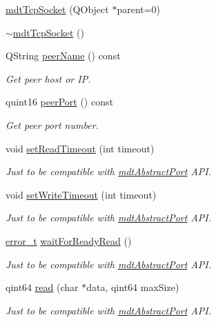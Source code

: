 \begin{DoxyCompactItemize}
\item 
\hyperlink{classmdt_tcp_socket_aeed1a50725a8e61f86de2bf67a92feb8}{mdt\-Tcp\-Socket} (Q\-Object $\ast$parent=0)
\item 
\hyperlink{classmdt_tcp_socket_ac1e7831d297471d6e5b920de5e9bb675}{$\sim$mdt\-Tcp\-Socket} ()
\item 
Q\-String \hyperlink{classmdt_tcp_socket_a1ce96231767c56f8108a8e977987e10f}{peer\-Name} () const 
\begin{DoxyCompactList}\small\item\em Get peer host or I\-P. \end{DoxyCompactList}\item 
quint16 \hyperlink{classmdt_tcp_socket_a2a6c3e034ca51a2f45ec136b864ba9a3}{peer\-Port} () const 
\begin{DoxyCompactList}\small\item\em Get peer port number. \end{DoxyCompactList}\item 
void \hyperlink{classmdt_tcp_socket_aae23057f2e0ee326d0fee78ffe3f00f9}{set\-Read\-Timeout} (int timeout)
\begin{DoxyCompactList}\small\item\em Just to be compatible with \hyperlink{classmdt_abstract_port}{mdt\-Abstract\-Port} A\-P\-I. \end{DoxyCompactList}\item 
void \hyperlink{classmdt_tcp_socket_ac59d2dfdf405b5382f0f20d5b9f75fd0}{set\-Write\-Timeout} (int timeout)
\begin{DoxyCompactList}\small\item\em Just to be compatible with \hyperlink{classmdt_abstract_port}{mdt\-Abstract\-Port} A\-P\-I. \end{DoxyCompactList}\item 
\hyperlink{classmdt_abstract_port_ad4121bb930c95887e77f8bafa065a85e}{error\-\_\-t} \hyperlink{classmdt_tcp_socket_adb09186cdacdac15291523c59f156cd4}{wait\-For\-Ready\-Read} ()
\begin{DoxyCompactList}\small\item\em Just to be compatible with \hyperlink{classmdt_abstract_port}{mdt\-Abstract\-Port} A\-P\-I. \end{DoxyCompactList}\item 
qint64 \hyperlink{classmdt_tcp_socket_a78842bc5ddcac2d96fb368ee575214cd}{read} (char $\ast$data, qint64 max\-Size)
\begin{DoxyCompactList}\small\item\em Just to be compatible with \hyperlink{classmdt_abstract_port}{mdt\-Abstract\-Port} A\-P\-I. \end{DoxyCompactList}\item 

\end{DoxyCompactItemize}
